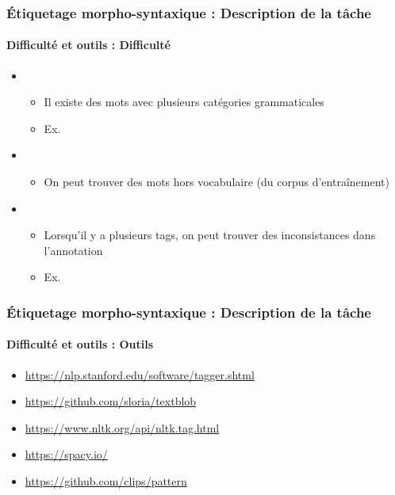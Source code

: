 \documentclass[xcolor=table]{beamer}
\begin{document}
\begin{frame}
\frametitle{Étiquetage morpho-syntaxique : Description de la tâche}
\framesubtitle{Difficulté et outils : Difficulté}

\begin{itemize}
	\item {}
	\begin{itemize}
		\item Il existe des mots avec plusieurs catégories grammaticales
		\item Ex. 
	\end{itemize}
	\item {}
	\begin{itemize}
		\item On peut trouver des mots hors vocabulaire (du corpus d'entraînement)
	\end{itemize}
	\item {} 
	\begin{itemize}
		\item Lorsqu'il y a plusieurs tags, on peut trouver des inconsistances dans l'annotation
		\item Ex. 
	\end{itemize}
\end{itemize}

\end{frame}

\begin{frame}
\frametitle{Étiquetage morpho-syntaxique : Description de la tâche}
\framesubtitle{Difficulté et outils : Outils}

\begin{itemize}
	\item \url{https://nlp.stanford.edu/software/tagger.shtml}
	\item \url{https://github.com/sloria/textblob}
	\item \url{https://www.nltk.org/api/nltk.tag.html}
	\item \url{https://spacy.io/}
	\item \url{https://github.com/clips/pattern}
\end{itemize}

\end{frame}
\end{document}
